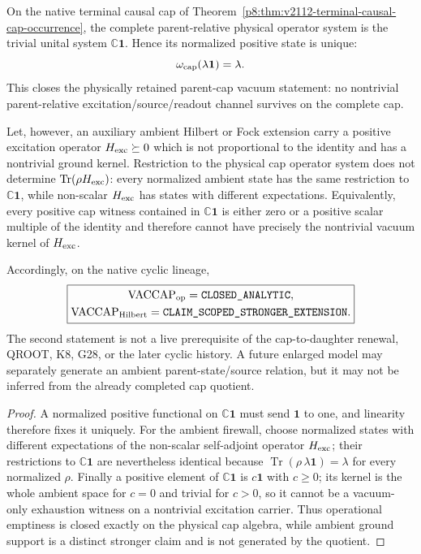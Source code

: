 \documentclass[12pt,a4paper]{article}
\begin{document}
\begin{corollary}
\label{p8:cor:v2125-vaccap-operational-retyping}
On the native terminal causal cap of
Theorem~\ref{p8:thm:v2112-terminal-causal-cap-occurrence}, the complete
parent-relative physical operator system is the trivial unital system
\(\mathbb C\mathbf1\).  Hence its normalized positive state is unique:
\[
 \omega_{\rm cap}(\lambda\mathbf1)=\lambda.
\]
This closes the physically retained parent-cap vacuum statement: no
nontrivial parent-relative excitation/source/readout channel survives on the
complete cap.

Let, however, an auxiliary ambient Hilbert or Fock extension carry a positive
excitation operator \(H_{\rm exc}\succeq0\) which is not proportional to the
identity and has a nontrivial ground kernel.  Restriction to the physical cap
operator system does not determine
\(\operatorname{Tr}(\rho H_{\rm exc})\): every normalized ambient state has the
same restriction to \(\mathbb C\mathbf1\), while non-scalar
\(H_{\rm exc}\) has states with different expectations.  Equivalently, every
positive cap witness contained in \(\mathbb C\mathbf1\) is either zero or a
positive scalar multiple of the identity and therefore cannot have precisely
the nontrivial vacuum kernel of \(H_{\rm exc}\).

Accordingly, on the native cyclic lineage,
\[
 \boxed{\begin{gathered}
 \mathrm{VACCAP}_{\rm op}=\texttt{CLOSED\_ANALYTIC},\\
 \mathrm{VACCAP}_{\rm Hilbert}=\texttt{CLAIM\_SCOPED\_STRONGER\_EXTENSION}.
 \end{gathered}}
\]
The second statement is not a live prerequisite of the cap-to-daughter
renewal, QROOT, K8, G28, or the later cyclic history.  A future enlarged model
may separately generate an ambient parent-state/source relation, but it may
not be inferred from the already completed cap quotient.
\end{corollary}

\begin{proof}
A normalized positive functional on \(\mathbb C\mathbf1\) must send
\(\mathbf1\) to one, and linearity therefore fixes it uniquely.  For the
ambient firewall, choose normalized states with different expectations of the
non-scalar self-adjoint operator \(H_{\rm exc}\); their restrictions to
\(\mathbb C\mathbf1\) are nevertheless identical because
\(\operatorname{Tr}(\rho\,\lambda\mathbf1)=\lambda\) for every normalized
\(\rho\).  Finally a positive element of \(\mathbb C\mathbf1\) is
\(c\mathbf1\) with \(c\ge0\); its kernel is the whole ambient space for
\(c=0\) and trivial for \(c>0\), so it cannot be a vacuum-only exhaustion
witness on a nontrivial excitation carrier.  Thus operational emptiness is
closed exactly on the physical cap algebra, while ambient ground support is a
distinct stronger claim and is not generated by the quotient.
\end{proof}
\end{document}
